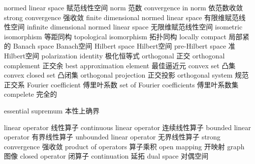 {normed linear space} 
{赋范线性空间}
{norm} 
{范数}
{convergence in norm} 
{依范数收敛}
{strong convergence} 
{强收敛}
{finite dimensional normed linear space} 
{有限维赋范线性空间}
{infinite dimensional normed linear space} 
{无限维赋范线性空间}
{isometric isomorphism} 
{等距同构}
{topological isomorphism} 
{拓扑同构}
{locally compact} 
{局部紧的}
{Banach space} 
{Banach空间}
{Hilbert space} 
{Hilbert空间}
{pre-Hilbert space} 
{准Hilbert空间}
{polarization identity} 
{极化恒等式}
{orthogonal} 
{正交}
{orthogonal complement} 
{正交余}
{best approximation element} 
{最佳逼近元}
{convex set} 
{凸集}
{convex closed set} 
{凸闭集}
{orthogonal projection} 
{正交投影}
{orthogonal system} 
{规范正交系}
{Fourier coefficient} 
{傅里叶系数}
{set of Fourier coefficients} 
{傅里叶系数集}
{compelete} 
{完全的}

{essential supremum} 
{本性上确界}

{linear operator} 
{线性算子}
{continuous linear operator} 
{连续线性算子}
{bounded linear operator} 
{有界线性算子}
{unbounded linear operator} 
{无界线性算子}
{strong convergence} 
{强收敛}
{product of operators} 
{算子乘积}
{open mapping} 
{开映射}
{graph} 
{图像}
{closed operator} 
{闭算子}
{continuation} 
{延拓}
{dual space} 
{对偶空间}

